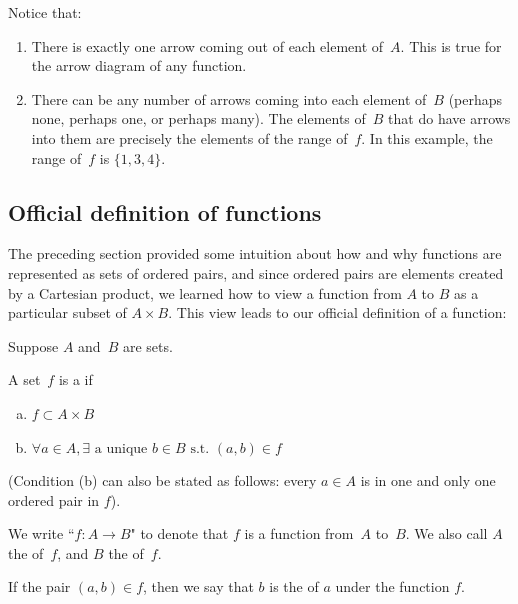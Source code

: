 Notice that:
\begin{enumerate}
\item There is exactly one arrow coming out of each element of~$A$. This is true for the arrow diagram of any function.
\item There can be any number of arrows coming into each element of~$B$ (perhaps none, perhaps one, or perhaps many). The elements of~$B$ that do have arrows into them are precisely the elements of the range of~$f$. In this example, the range of~$f$ is $\{1,3,4\}$.
\end{enumerate}


\subsection{Official definition of functions}

The preceding section provided some intuition about how and why functions are represented as sets of ordered pairs, and since ordered pairs are elements created by a Cartesian product, we learned how to view a function from $A$ to $B$ as a particular subset of $A \times B$.  This view leads to our official definition of a function:

\begin{defn}\label{functionDef}
 Suppose $A$ and~$B$ are sets.

A set~$f$ is a 
 if
\begin{enumerate}[(a)]
\item \label{FunctionDefn-func-pair}
$f \subset A \times B$
\item \label{FunctionDefn-func-unique}
$\forall a \in A, \exists \mbox{ a unique } b \in B \mbox{ s.t. } (a, b) \in f$
\end{enumerate}

\noindent
(Condition (b) can also be stated as follows: every $a \in A$ is in one and only one ordered pair in $f$).  

We write ``$f \colon A \to B$" to denote that $f$ is a function from~$A$ to~$B$.
We also call
$A$  the  of~$f$, and
$B$ the  of~$f$.

If the pair $(a, b) \in f$, then we say that $b$ is the  of $a$ under the function $f$.


\end{defn}

